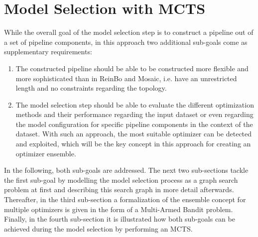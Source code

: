 \section{Model Selection with MCTS}
\label{sec:approach:selection}
While the overall goal of the model selection step is to construct a pipeline out of a set of pipeline components, in this approach two additional sub-goals come as supplementary requirements:
\begin{enumerate}
    \item The constructed pipeline should be able to be constructed more flexible and more sophisticated than in ReinBo and Mosaic, i.e. have an unrestricted length and no constraints regarding the topology.
    \item The model selection step should be able to evaluate the different optimization methods and their performance regarding the input dataset or even regarding the model configuration for specific pipeline components in the context of the dataset.
    With such an approach, the most suitable optimizer can be detected and exploited, which will be the key concept in this approach for creating an optimizer ensemble.
\end{enumerate}
In the following, both sub-goals are addressed.
The next two sub-sections tackle the first sub-goal by modelling the model selection process as a graph search problem at first and describing this search graph in more detail afterwards.
Thereafter, in the third sub-section a formalization of the ensemble concept for multiple optimizers is given in the form of a Multi-Armed Bandit problem.
Finally, in the fourth sub-section it is illustrated how both sub-goals can be achieved during the model selection by performing an MCTS.

